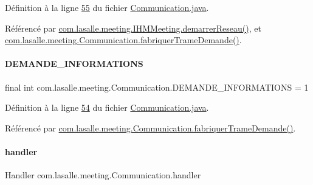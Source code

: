 Définition à la ligne \hyperlink{_communication_8java_source_l00055}{55} du fichier \hyperlink{_communication_8java_source}{Communication.\+java}.



Référencé par \hyperlink{_i_h_m_meeting_8java_source_l00082}{com.\+lasalle.\+meeting.\+I\+H\+M\+Meeting.\+demarrer\+Reseau()}, et \hyperlink{_communication_8java_source_l00180}{com.\+lasalle.\+meeting.\+Communication.\+fabriquer\+Trame\+Demande()}.

\mbox{\label{classcom_1_1lasalle_1_1meeting_1_1_communication_a9a0b852b1753e97242edaba93f63a4d6}} 
\paragraph{\texorpdfstring{D\+E\+M\+A\+N\+D\+E\+\_\+\+I\+N\+F\+O\+R\+M\+A\+T\+I\+O\+NS}{DEMANDE\_INFORMATIONS}}
{\footnotesize\ttfamily final int com.\+lasalle.\+meeting.\+Communication.\+D\+E\+M\+A\+N\+D\+E\+\_\+\+I\+N\+F\+O\+R\+M\+A\+T\+I\+O\+NS = 1\hspace{0.3cm}{\ttfamily [static]}}



Définition à la ligne \hyperlink{_communication_8java_source_l00054}{54} du fichier \hyperlink{_communication_8java_source}{Communication.\+java}.



Référencé par \hyperlink{_communication_8java_source_l00180}{com.\+lasalle.\+meeting.\+Communication.\+fabriquer\+Trame\+Demande()}.

\mbox{\label{classcom_1_1lasalle_1_1meeting_1_1_communication_a05fa5f360f28819a9e106e0265a74643}} 
\paragraph{\texorpdfstring{handler}{handler}}
{\footnotesize\ttfamily Handler com.\+lasalle.\+meeting.\+Communication.\+handler\hspace{0.3cm}{\ttfamily [private]}}



